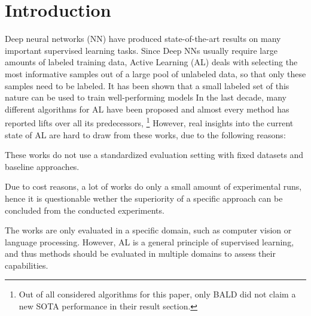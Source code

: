 \documentclass[]{article}
\begin{document}
\section{Introduction}
Deep neural networks (NN) have produced state-of-the-art results on many
important supervised learning tasks. Since Deep NNs usually require large
amounts of labeled training data, Active Learning (AL) deals with
selecting the most informative samples out of a large pool of unlabeled data, so
that only these samples need to be labeled. It has been shown that a small
labeled set of this nature can be used to train well-performing models
In the last decade, many different algorithms for AL have been proposed and
almost every method has reported lifts over all its predecessors, \footnote{Out
of all considered algorithms for this paper, only BALD \cite{gal2017deep} did
not claim a new SOTA performance in their result section.} However, real
insights into the current state of AL are hard to draw from these works, due to
the following reasons:
\begin{inparaenum}
\item\label{prob1al} These works do not use a standardized evaluation setting with fixed
datasets and baseline approaches.
\item Due to cost reasons, a lot of works do only a small amount of experimental
runs, hence it is questionable wether the superiority of a specific approach can
be concluded from the conducted experiments.
\item The works are only evaluated in a specific domain, such as computer vision
or language processing. However, AL is a general principle of supervised
learning, and thus methods should be evaluated in multiple domains to assess
their capabilities.
\end{inparaenum}
\end{document}
